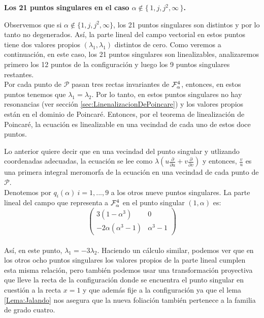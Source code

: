 \textbf{Los 21 puntos singulares en el caso $\alpha\notin\{\, 1,j,j^{2},\infty \, \}$.}

Observemos que si $\alpha\notin\{1,j,j^{2},\infty \}$, los 21 puntos singulares son distintos y por lo tanto no degenerados. Así, la parte lineal del campo vectorial en estos puntos tiene dos valores propios $(\lambda_{1},\lambda_{1})$ distintos de cero. Como veremos a continuación, en este caso, los 21 puntos singulares son linealizables, analizaremos primero los 12 puntos de la configuración y luego los 9 puntos singulares restantes.\\

Por cada punto de $\mathcal{P}$ pasan tres rectas invariantes de $\Fol[4]{\alpha}$, entonces, en estos puntos tenemos que $\lambda_{1} = \lambda_{2}$. Por lo tanto, en estos puntos singulares no hay resonancias (ver sección \ref{sec:LinenalizacionDePoincare}) y los valores propios están en el dominio de Poincaré. Entonces, por el teorema de linealización de Poincaré, la ecuación es linealizable en una vecindad de cada uno de estos doce puntos.

Lo anterior quiere decir que en una vecindad del punto singular y utlizando coordenadas adecuadas, la ecuación se lee como $ \lambda (u \frac{\partial}{\partial u} + v \frac{\partial}{\partial v})$ y entonces, $\frac{v}{u}$ es una primera integral meromorfa de la ecuación en una vecindad de cada punto de $\mathcal{P}$.
\\

Denotemos por $q_{i}(\alpha) \ i=1,...,9$ a los otros nueve puntos singulares. La parte lineal del campo que representa a $\Fol[4]{\alpha}$  en el punto singular $(1,\alpha )$ es:
\\

$$\begin{pmatrix}

3(1-\alpha^{3}) & 0 \\
-2\alpha(\alpha^{3}-1) & \alpha^{3} -1

\end{pmatrix}$$
\\

\noindent Así, en este punto, $\lambda_{1} = -3\lambda_{2}$. Haciendo un cálculo similar, podemos ver que en los otros ocho puntos singulares los valores propios de la parte lineal cumplen esta misma relación, pero también podemos usar una transformación proyectiva que lleve la recta de la configuración donde se encuentra el punto singular en cuestión a la recta $x=1$ y que además fije a la configuración  ya que el lema \ref{Lema:Jalando} nos asegura que la nueva foliación también pertenece a la familia de grado cuatro.
\\

